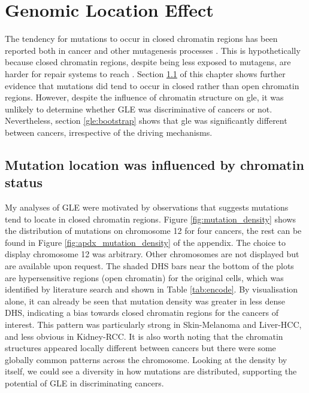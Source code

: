 \chapter{Genomic Location Effect}\label{gle}

The tendency for mutations to occur in closed \gls{chromatin} regions has been reported both in cancer and other mutagenesis processes \citep{Polak2015,Prendergast2007ChromatinGenome}. This is hypothetically because closed chromatin regions, despite being less exposed to mutagens, are harder for repair systems to reach \citep{Prendergast2007ChromatinGenome,Teng1997ExcisionSequences, Morse2002PhotoreactivationCerevisiae}. Section \ref{gle:chromatin} of this chapter shows further evidence that mutations did tend to occur in closed rather than open chromatin regions. However, despite the influence of chromatin structure on \gls{gle}, it was unlikely to determine whether GLE was discriminative of cancers or not. Nevertheless, section \ref{gle:bootstrap} shows that \gls{gle} was significantly different between cancers, irrespective of the driving mechanisms. 

\section{Mutation location was influenced by chromatin status}\label{gle:chromatin}
My analyses of GLE were motivated by observations that suggests mutations tend to locate in closed chromatin regions. Figure \ref{fig:mutation_density} shows the distribution of mutations on chromosome 12 for four cancers, the rest can be found in Figure \ref{fig:apdx_mutation_density} of the appendix. The choice to display chromosome 12 was arbitrary. Other chromosomes are not displayed but are available upon request. The shaded DHS bars near the bottom of the plots are hypersensitive regions (open chromatin) for the original cells, which was identified by literature search and shown in Table \ref{tab:encode}. By visualisation alone, it can already be seen that mutation density was greater in less dense DHS, indicating a bias towards closed chromatin regions for the cancers of interest. This pattern was particularly strong in Skin-Melanoma and Liver-HCC, and less obvious in Kidney-RCC. It is also worth noting that the chromatin structures appeared locally different between cancers but there were some globally common patterns across the chromosome. Looking at the density by itself, we could see a diversity in how mutations are distributed, supporting the potential of GLE in discriminating cancers. 

